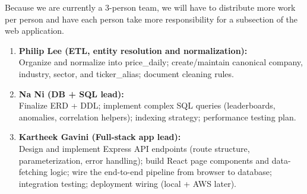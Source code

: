 \documentclass[11pt]{article}
\begin{document}
Because we are currently a 3-person team, we will have to distribute more work per person and have each person take more responsibility for a subsection of the web application.

\begin{enumerate}[label=\textbf{\arabic*.}]
    \item \textbf{Philip Lee (ETL, entity resolution and normalization):}\\
    Organize and normalize into price\_daily; create/maintain canonical company, industry, sector, and ticker\_alias; document cleaning rules.

    \item \textbf{Na Ni (DB + SQL lead):}\\
    Finalize ERD + DDL; implement complex SQL queries (leaderboards, anomalies, correlation helpers); indexing strategy; performance testing plan.

    \item \textbf{Kartheek Gavini (Full-stack app lead):}\\
    Design and implement Express API endpoints (route structure, parameterization, error handling); build React page components and data-fetching logic; wire the end-to-end pipeline from browser to database; integration testing; deployment wiring (local + AWS later).
\end{enumerate}
\end{document}
